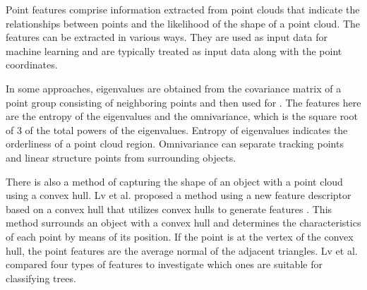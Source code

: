 \begin{deletedblock}
Point features comprise information extracted from point clouds that indicate the relationships between points and the likelihood of the shape of a point cloud. 
  The features can be extracted in various ways. 
They are used as input data for machine learning and are typically treated as input data along with the point coordinates. 
\end{deletedblock}

\begin{deletedblock}
In some approaches, eigenvalues are obtained from the covariance matrix of a point group consisting of neighboring points and then used for \cite{rs9030277,9132746,8490990}.
  The features here are the entropy of the eigenvalues and the omnivariance, which is the square root of 3 of the total powers of the eigenvalues. 
    Entropy of eigenvalues indicates the orderliness of a point cloud region. 
    Omnivariance can separate tracking points and linear structure points from surrounding objects. 
\end{deletedblock}

\begin{deletedblock}
There is also a method of capturing the shape of an object with a point cloud using a convex hull. 
  Lv et al. proposed a method using a new feature descriptor based on a convex hull that utilizes convex hulls to generate features \cite{9353594}. 
    This method surrounds an object with a convex hull and determines the characteristics of each point by means of its position. 
    If the point is at the vertex of the convex hull, the point features are the average normal of the adjacent triangles. 
  Lv et al. compared four types of features to investigate which ones are suitable for classifying trees. 
\end{deletedblock}


